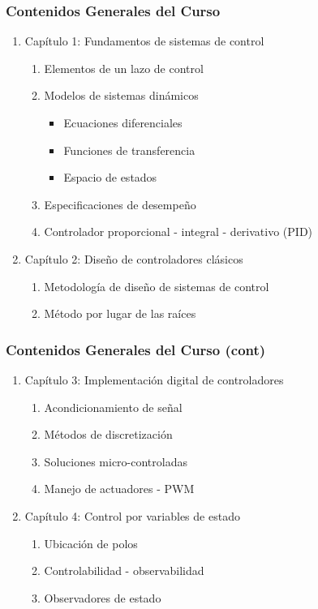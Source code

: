 \documentclass[aspectratio=169]{beamer}
\theoremstyle{definition}
\theoremstyle{plain}
\theoremstyle{remark}
\newcounter{saveenumi}
\newcommand{\seti}{\setcounter{saveenumi}{\value{enumi}}}
\newcommand{\conti}{\setcounter{enumi}{\value{saveenumi}}}
\begin{document}
\begin{frame}[<+->]\frametitle{Contenidos Generales del Curso}
\begin{enumerate}
  \item Capítulo 1: Fundamentos de sistemas de control
  \begin{enumerate}
     \item Elementos de un lazo de control
     \item Modelos de sistemas dinámicos
     \begin{itemize}
       \item Ecuaciones diferenciales
       \item Funciones de transferencia
       \item Espacio de estados
     \end{itemize}
    \item Especificaciones de desempeño
    \item Controlador proporcional - integral - derivativo (PID)
   \end{enumerate}
   \item Capítulo 2: Diseño de controladores clásicos
   \begin{enumerate}
     \item Metodología de diseño de sistemas de control
     \item Método por lugar de las raíces
   \end{enumerate}
   \seti
\end{enumerate}
\end{frame}

\begin{frame}[<+->]\frametitle{Contenidos Generales del Curso (cont)}
\begin{enumerate}
  \conti
  \item Capítulo 3: Implementación digital de controladores
  \begin{enumerate}
    \item Acondicionamiento de señal
    \item Métodos de discretización
    \item Soluciones micro-controladas
    \item Manejo de actuadores - PWM    
  \end{enumerate}
  \item Capítulo 4: Control por variables de estado
  \begin{enumerate}
    \item Ubicación de polos
    \item Controlabilidad - observabilidad
    \item Observadores de estado
  \end{enumerate}
\end{enumerate}
\end{frame}
\end{document}
